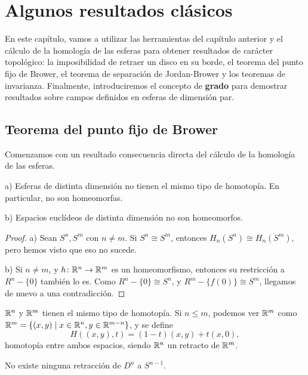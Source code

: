 \chapter{Algunos resultados clásicos}\label{ch:resultados}

En este capítulo, vamos a utilizar las herramientas del capítulo anterior y el cálculo
de la homología de las esferas para obtener resultados de carácter topológico: la
imposibilidad de retraer un disco en su borde, el teorema del punto fijo de Brower,
el teorema de separación de Jordan-Brower y los teoremas de invarianza. Finalmente,
introduciremos el concepto de \textbf{grado} para demostrar resultados sobre campos
definidos en esferas de dimensión par.

\section{Teorema del punto fijo de Brower}

Comenzamos con un resultado consecuencia directa del cálculo de la homología de las esferas.

\begin{proposition}
  a) Esferas de distinta dimensión no tienen el mismo tipo de homotopía. En particular, no son homeomorfas.

  b) Espacios euclídeos de distinta dimensión no son homeomorfos.
\end{proposition}

\begin{proof}
  a) Sean $S^n, S^m$ con $n \neq m$. Si $S^n \cong S^m$, entonces $H_n(S^n) \cong H_n(S^m)$, pero hemos visto que eso no sucede.

  b) Si $n \neq m$, y $h \colon \mathbb{R}^n \to \mathbb{R}^m$ es un homeomorfismo, entonces su restricción a $R^n - \{0\}$ también lo es.
  Como $R^n - \{0\} \cong S^n$, y $R^m - \{f(0)\} \cong S^m$, llegamos de nuevo a una contradicción.
\end{proof}

\begin{remark}
  $\mathbb{R}^n$ y $\mathbb{R}^m$ tienen el mismo tipo de homotopía. Si $n \leq m$, podemos ver $\mathbb{R}^m$ como
  $\mathbb{R}^m = \{(x, y) \mid x \in \mathbb{R}^n, y \in \mathbb{R}^{m-n}\}$, y se define
  \[ H((x, y), t) = (1-t)(x, y) + t(x, 0), \]
  homotopía entre ambos espacios, siendo $\mathbb{R}^n$ un retracto de $\mathbb{R}^m$.
\end{remark}

\begin{lemma}
  No existe ninguna retracción de $D^n$ a $S^{n-1}$.
\end{lemma}

